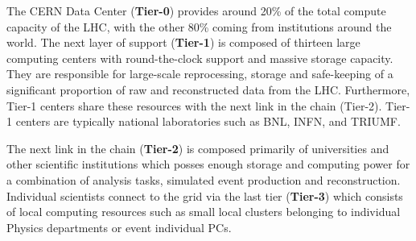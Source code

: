 The CERN Data Center (\textbf{Tier-0}) provides around 20\% of the total compute capacity of the LHC, with the other 80\% coming from institutions around the world.
The next layer of support (\textbf{Tier-1}) is composed of thirteen large computing centers with round-the-clock support and massive storage capacity.
They are responsible for large-scale reprocessing, storage and safe-keeping of a significant proportion of raw and reconstructed data from the LHC.
Furthermore, Tier-1 centers share these resources with the next link in the chain (Tier-2).
Tier-1 centers are typically national laboratories such as BNL, INFN, and TRIUMF.

The next link in the chain (\textbf{Tier-2}) is composed primarily of universities and other scientific institutions which posses enough storage and computing power for a combination of analysis tasks, simulated event production and reconstruction.
Individual scientists connect to the grid via the last tier (\textbf{Tier-3}) which consists of local computing resources such as small local clusters belonging to individual Physics departments or event individual PCs.
